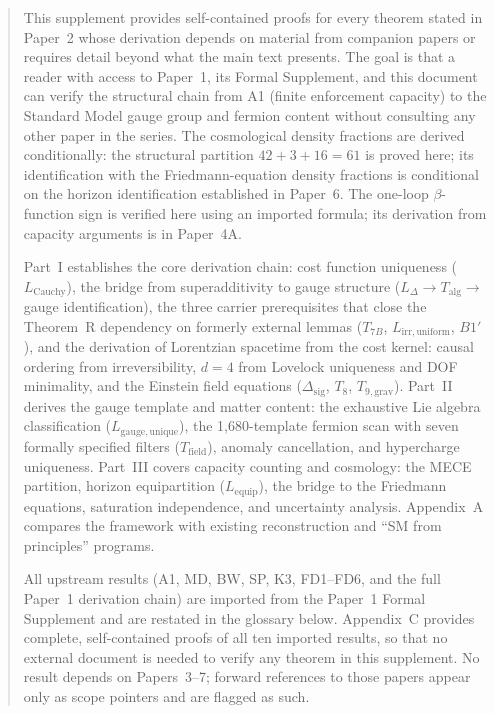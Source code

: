 \documentclass[11pt,a4paper]{article}
\theoremstyle{definition}
\begin{document}
\begin{abstract}
\noindent
This supplement provides self-contained proofs for every theorem stated in Paper~2 whose derivation depends on material from companion papers or requires detail beyond what the main text presents.  The goal is that a reader with access to Paper~1, its Formal Supplement, and this document can verify the structural chain from A1 (finite enforcement capacity) to the Standard Model gauge group and fermion content without consulting any other paper in the series.  The cosmological density fractions are derived conditionally: the structural partition $42 + 3 + 16 = 61$ is proved here; its identification with the Friedmann-equation density fractions is conditional on the horizon identification established in Paper~6.  The one-loop $\beta$-function sign is verified here using an imported formula; its derivation from capacity arguments is in Paper~4A.

Part~I establishes the core derivation chain: cost function uniqueness ($L_{\mathrm{Cauchy}}$), the bridge from superadditivity to gauge structure ($L_\Delta \to T_{\mathrm{alg}} \to$ gauge identification), the three carrier prerequisites that close the Theorem~R dependency on formerly external lemmas ($T_{7B}$, $L_{\mathrm{irr,uniform}}$, $B1'$), and the derivation of Lorentzian spacetime from the cost kernel: causal ordering from irreversibility, $d = 4$ from Lovelock uniqueness and DOF minimality, and the Einstein field equations ($\Delta_{\mathrm{sig}}$, $T_8$, $T_{9,\mathrm{grav}}$).  Part~II derives the gauge template and matter content: the exhaustive Lie algebra classification ($L_{\mathrm{gauge,unique}}$), the 1{,}680-template fermion scan with seven formally specified filters ($T_{\mathrm{field}}$), anomaly cancellation, and hypercharge uniqueness.  Part~III covers capacity counting and cosmology: the MECE partition, horizon equipartition ($L_{\mathrm{equip}}$), the bridge to the Friedmann equations, saturation independence, and uncertainty analysis.  Appendix~A compares the framework with existing reconstruction and ``SM from principles'' programs.

All upstream results (A1, MD, BW, SP, K3, FD1--FD6, and the full Paper~1 derivation chain) are imported from the Paper~1 Formal Supplement and are restated in the glossary below.  Appendix~C provides complete, self-contained proofs of all ten imported results, so that no external document is needed to verify any theorem in this supplement.  No result depends on Papers~3--7; forward references to those papers appear only as scope pointers and are flagged as such.
\end{abstract}
\end{document}
